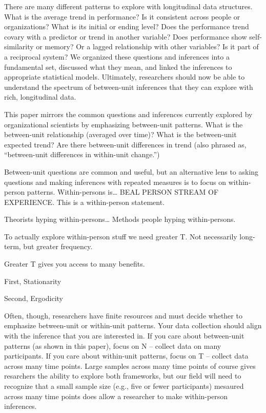 \documentclass[english,,man]{apa6}
\theoremstyle{definition}
\theoremstyle{definition}
\theoremstyle{definition}
\theoremstyle{remark}
\begin{document}
There are many different patterns to explore with longitudinal data
structures. What is the average trend in performance? Is it consistent
across people or organizations? What is its initial or ending level?
Does the performance trend covary with a predictor or trend in another
variable? Does performance show self-similarity or memory? Or a lagged
relationship with other variables? Is it part of a reciprocal system? We
organized these questions and inferences into a fundamental set,
discussed what they mean, and linked the inferences to appropriate
statistical models. Ultimately, researchers should now be able to
understand the spectrum of between-unit inferences that they can explore
with rich, longitudinal data.

This paper mirrors the common questions and inferences currently
explored by organizational scientists by emphasizing between-unit
patterns. What is the between-unit relationship (averaged over time)?
What is the between-unit expected trend? Are there between-unit
differences in trend (also phrased as, \enquote{between-unit differences
in within-unit change.})

Between-unit questions are common and useful, but an alternative lens to
asking questions and making inferences with repeated measures is to
focus on within-person patterns. Within-persons is\ldots{} BEAL PERSON
STREAM OF EXPERIENCE. This is a within-person statement.

Theorists hyping within-persons\ldots{} Methods people hyping
within-persons.

To actually explore within-person stuff we need greater T. Not
necessarily long-term, but greater frequency.

Greater T gives you access to many benefits.

First, Stationarity

Second, Ergodicity

Often, though, researchers have finite resources and must decide whether
to emphasize between-unit or within-unit patterns. Your data collection
should align with the inference that you are interested in. If you care
about between-unit patterns (as shown in this paper), focus on N --
collect data on many participants. If you care about within-unit
patterns, focus on T -- collect data across many time points. Large
samples across many time points of course gives resarchers the ability
to explore both frameworks, but our field will need to recognize that a
small sample size (e.g., five or fewer participants) mesaured across
many time points does allow a researcher to make within-person
inferences.
\end{document}

